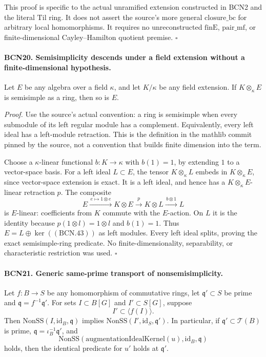 This proof is specific to the actual unramified extension
constructed in BCN2 and the literal \(\mathrm{Til}\) ring.
It does not assert the source's more general
\(\mathrm{closure\_bc}\) for arbitrary local homomorphisms.
It requires no unreconstructed \(\mathrm{finE}\),
\(\mathrm{pair\_mf}\), or finite-dimensional
Cayley--Hamilton quotient premise.
\hfill\(\square\)

\paragraph{BCN20. Semisimplicity descends under a field extension
without a finite-dimensional hypothesis.}\label{claim:BCN20}
Let \(E\) be any algebra over a field \(\kappa\), and let
\(K/\kappa\) be any field extension.  If \(K\otimes_\kappa E\)
is semisimple as a ring, then so is \(E\).

\emph{Proof.}
Use the source's actual convention: a ring is semisimple
when every submodule of its left regular module has a
complement.  Equivalently, every left ideal has a
left-module retraction.  This is the definition in the
mathlib commit pinned by the source, not a convention
that builds finite dimension into the term.

Choose a \(\kappa\)-linear functional \(b:K\to\kappa\)
with \(b(1)=1\), by extending \(1\) to a vector-space basis.
For a left ideal \(L\subset E\), the tensor
\(K\otimes_\kappa L\) embeds in \(K\otimes_\kappa E\),
since vector-space extension is exact.
It is a left ideal, and hence has a
\(K\otimes_\kappa E\)-linear retraction \(p\).
The composite
\[
 E\xrightarrow{\,e\mapsto1\otimes e\,}
 K\otimes E\xrightarrow{p}K\otimes L
 \xrightarrow{\,b\otimes1\,}L
                                                               \tag{BCN.43}
\]
is \(E\)-linear: coefficients from \(K\) commute with
the \(E\)-action.  On \(L\) it is the identity because
\(p(1\otimes l)=1\otimes l\) and \(b(1)=1\).
Thus \(E=L\oplus\ker((\mathrm{BCN.43}))\) as left modules.
Every left ideal splits, proving the exact semisimple-ring
predicate.  No finite-dimensionality, separability, or
characteristic restriction was used.
\hfill\(\square\)

\paragraph{BCN21. Generic same-prime transport of nonsemisimplicity.}\label{claim:BCN21}
Let \(f:B\to S\) be any homomorphism of commutative rings,
let \(\mathfrak q'\subset S\) be prime and
\(\mathfrak q=f^{-1}\mathfrak q'\).
For sets \(I\subset B[G]\) and \(I'\subset S[G]\), suppose
\[
 I'\subset\langle f(I)\rangle .                               \tag{BCN.44a}
\]
Then \(\mathrm{NonSS}(I,\mathrm{id}_B,\mathfrak q)\)
implies \(\mathrm{NonSS}(I',\mathrm{id}_S,\mathfrak q')\).
In particular, if \(\mathfrak q'\subset\mathscr T(B)\)
is prime, \(\mathfrak q=\iota_B^{-1}\mathfrak q'\), and
\[
 \mathrm{NonSS}
   (\mathrm{augmentationIdealKernel}(u),\mathrm{id}_B,
    \mathfrak q)
\]
holds, then the identical predicate for \(u'\) holds
at \(\mathfrak q'\).


